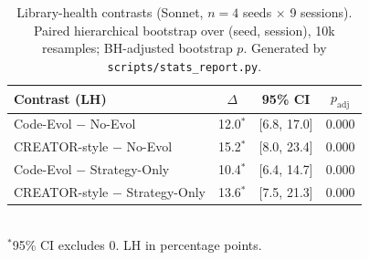 \begin{table}[t]
\centering\small
\caption{Library-health contrasts (Sonnet, $n{=}4$ seeds $\times$ 9 sessions). Paired hierarchical bootstrap over (seed, session), 10k resamples; BH-adjusted bootstrap $p$. Generated by \texttt{scripts/stats\_report.py}.}
\label{tab:lh_stats}
\begin{tabular}{lccc}
\toprule
\textbf{Contrast (LH)} & \textbf{$\Delta$} & \textbf{95\% CI} & \textbf{$p_{\mathrm{adj}}$} \\
\midrule
Code-Evol $-$ No-Evol & 12.0$^{*}$ & [6.8, 17.0] & 0.000 \\
CREATOR-style $-$ No-Evol & 15.2$^{*}$ & [8.0, 23.4] & 0.000 \\
Code-Evol $-$ Strategy-Only & 10.4$^{*}$ & [6.4, 14.7] & 0.000 \\
CREATOR-style $-$ Strategy-Only & 13.6$^{*}$ & [7.5, 21.3] & 0.000 \\
\bottomrule
\end{tabular}
\\[2pt]\footnotesize $^{*}$95\% CI excludes 0. LH in percentage points.
\end{table}